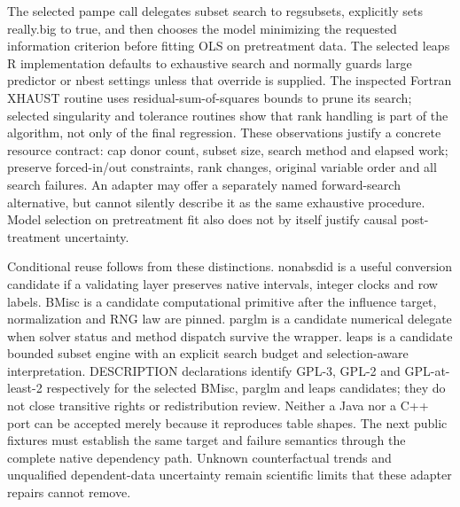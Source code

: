 The selected pampe call delegates subset search to regsubsets, explicitly sets really.big to true, and then chooses the model minimizing the requested information criterion before fitting OLS on pretreatment data. The selected leaps R implementation defaults to exhaustive search and normally guards large predictor or nbest settings unless that override is supplied. The inspected Fortran XHAUST routine uses residual-sum-of-squares bounds to prune its search; selected singularity and tolerance routines show that rank handling is part of the algorithm, not only of the final regression. These observations justify a concrete resource contract: cap donor count, subset size, search method and elapsed work; preserve forced-in/out constraints, rank changes, original variable order and all search failures. An adapter may offer a separately named forward-search alternative, but cannot silently describe it as the same exhaustive procedure. Model selection on pretreatment fit also does not by itself justify causal post-treatment uncertainty.\citep{exec28_panel_delegates,exec29_panel_inference_sources}

Conditional reuse follows from these distinctions. nonabsdid is a useful conversion candidate if a validating layer preserves native intervals, integer clocks and row labels. BMisc is a candidate computational primitive after the influence target, normalization and RNG law are pinned. parglm is a candidate numerical delegate when solver status and method dispatch survive the wrapper. leaps is a candidate bounded subset engine with an explicit search budget and selection-aware interpretation. DESCRIPTION declarations identify GPL-3, GPL-2 and GPL-at-least-2 respectively for the selected BMisc, parglm and leaps candidates; they do not close transitive rights or redistribution review. Neither a Java nor a C++ port can be accepted merely because it reproduces table shapes. The next public fixtures must establish the same target and failure semantics through the complete native dependency path. Unknown counterfactual trends and unqualified dependent-data uncertainty remain scientific limits that these adapter repairs cannot remove.\citep{exec29_panel_inference_sources}
